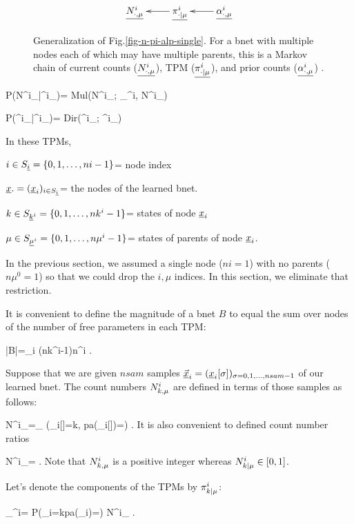\begin{figure}[h!]
$$
\xymatrix{
\ul{N^i_\dotmu}
&\ul{\pi^i_\dotbarmu}\ar[l]
&
\ul{\alp^i_\dotmu}\ar[l]
}$$
\caption{
Generalization
of Fig.\ref{fig-n-pi-alp-single}.
For a bnet with multiple nodes
each of which may have multiple parents,
this is  a
Markov chain of
current counts ($\underline{N^i_{\cdot, \mu}}$),
TPM ($\underline{\pi^i_{\cdot|\mu}}$),
and
prior counts ($\underline{\alpha^i_{\cdot, \mu}}$)
.}
\label{fig-n-pi-alp-many}
\end{figure}

\beq\color{blue}
P(N^i_\dotmu|\pi^i_\dotbarmu)=
Mul(N^i_\dotmu;
\pi_\dotbarmu^i, N^i_\plusmu)
\eeq

\beq\color{blue}
P(\pi^i_\dotbarmu|\alp^i_\dotmu)=
Dir(\pi^i_\dotbarmu; \alp^i_\dotmu)
\eeq

In these TPMs,

$i\in
S_{\underline{i}}=\{0, 1, \dots, ni-1\}$= node index

${\underline{x}}.=({\underline{x}}_i)_{i\in S_{\underline{i}}}$= the 
nodes of the learned bnet.

$k\in
S_{{\underline{k}}^i}=\{0, 1, \dots, nk^i-1\}$= states 
of node ${\underline{x}}_i$

$\mu\in
S_{\underline{\mu}^i}=\{0, 1, \dots, n\mu^i-1\}$=
states of parents of node ${\underline{x}}_i$.

In the previous section,
we assumed a single node ($ni=1$)
with no parents ($n\mu^0=1$)
so that 
we could drop  the $i, \mu$
indices.
In this section, we eliminate
that restriction.


It is 
convenient
to define the magnitude of a  bnet
 $B$
to equal the sum
over nodes of the number 
of free parameters in each TPM:

\beq
|B|=\sum_i
(nk^i-1)n\mu^i
\;.
\eeq

Suppose that 
we are given $nsam$ samples 
$
\vec{{\underline{x}}}_i=
({\underline{x}}_i[\sigma])_
{\sigma=0, 1, \ldots, nsam-1}
$ of 
our learned bnet. The count numbers
$N^i_{k,\mu}$ are defined 
in terms of those samples 
as follows:
 

\beq
N^i_\kmu=\sum_\sigma
\indi(\rvx_i[\sigma]=k, pa(\rvx_i[\sigma])=\mu )
\;.
\eeq
It is also convenient
to
defined
count number ratios

\beq
N^i_\kbarmu=
\;.
\eeq
Note that
$N^i_{k,\mu}$
is a positive integer whereas
$N^i_{k|\mu}\in[0,1]$.

Let's denote
the components of the TPMs by
$\pi^i_{k|\mu}$:


\beq
\pi_\kbarmu^i=
P(\rvx_i=k\cond pa(\rvx_i)=\mu )
\approx
N^i_\kbarmu
\;.
\eeq


